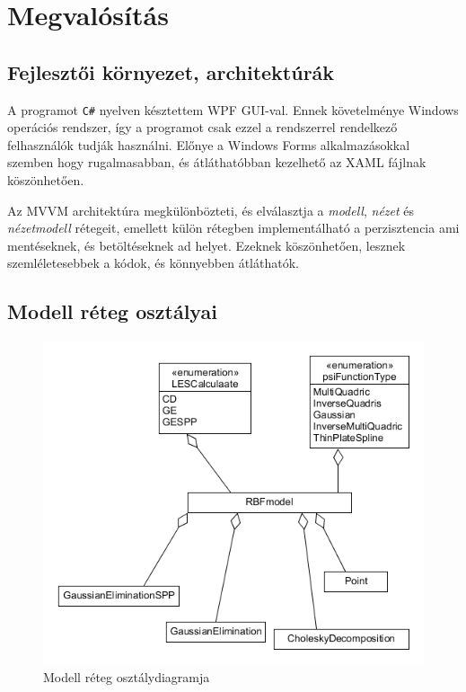 	\newpage
	\section{Megvalósítás}
		\subsection{Fejlesztői környezet, architektúrák}
		A programot \texttt{C\#} nyelven késztettem WPF GUI-val. Ennek követelménye Windows operációs rendszer, így a programot csak ezzel a rendszerrel rendelkező felhasználók tudják használni. Előnye a Windows Forms alkalmazásokkal szemben hogy rugalmasabban, és átláthatóbban kezelhető az XAML fájlnak köszönhetően.
	
		Az MVVM architektúra megkülönbözteti, és elválasztja a \textit{modell}, \textit{nézet} és \textit{nézetmodell} rétegeit, emellett külön rétegben implementálható a perzisztencia ami mentéseknek, és betöltéseknek ad helyet. Ezeknek köszönhetően, lesznek szemléletesebbek a kódok, és könnyebben átláthatók.
	
		\subsection{Modell réteg osztályai}
			
			\begin{figure}[ht]
				\centering
				\includegraphics[scale=0.8]{developer/Model.png}
				\caption{Modell réteg osztálydiagramja}
			\end{figure}
		
